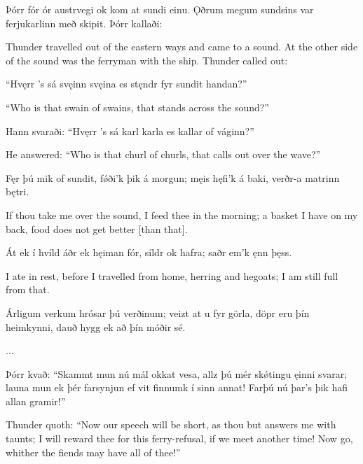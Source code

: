 Þórr fór ór austrvegi ok kom at sundi einu. Ǫðrum megum sundsins var ferjukarlinn með skipit. Þórr kallaði:

Thunder travelled out of the eastern ways and came to a sound. At the other side of the sound was the ferryman with the ship. Thunder called out:

“Hvęrr ’s sá svęinn svęina \hld es stęndr fyr sundit handan?”

“Who is that swain of swains, that stands across the sound?”

Hann svaraði:
“Hvęrr ’s sá karl karla \hld es kallar of váginn?”

He answered:
“Who is that churl of churls, that calls out over the wave?”

Fęr þú mik of sundit, \hld fǿði’k þik á morgun;
męis hęfi’k á baki, \hld verðr-a matrinn bętri. 

If thou take me over the sound, I feed thee in the morning; a basket I have on my back, food does not get better [than that].

Át ek í hvíld \hld áðr ek hęiman fór,
síldr ok hafra; \hld saðr em’k ęnn þęss.

I ate in rest, before I travelled from home, herring and hegoats; I am still full from that.

Árligum verkum
hrósar þú verðinum;
veizt at u fyr görla,
döpr eru þín heimkynni,
dauð hygg ek að þín móðir sé. 

...

Þórr kvað:
“Skammt mun nú mál okkat vesa, \hld allz þú mér skǿtingu ęinni svarar;
launa mun ek þér farsynjun \hld ef vit finnumk í sinn annat!
Farþú nú þar’s þik hafi allan gramir!”

Thunder quoth:
“Now our speech will be short, as thou but answers me with taunts; I will reward thee for this ferry-refusal, if we meet another time! Now go, whither the fiends may have all of thee!”
